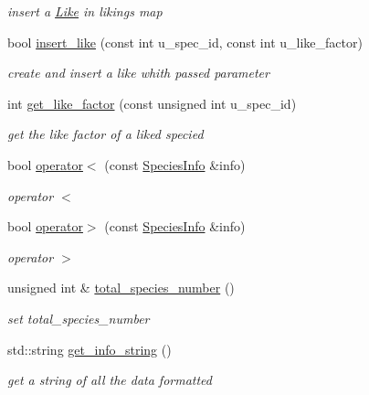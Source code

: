 \begin{DoxyCompactItemize}
\begin{DoxyCompactList}\small\item\em insert a \hyperlink{structLike}{Like} in likings map \end{DoxyCompactList}\item 
bool \hyperlink{structSpeciesInfo_a5c1c1c98c4f8bf4ae0b85d3c3943fff5}{insert\_\-like} (const int u\_\-spec\_\-id, const int u\_\-like\_\-factor)
\begin{DoxyCompactList}\small\item\em create and insert a like whith passed parameter \end{DoxyCompactList}\item 
int \hyperlink{structSpeciesInfo_af2f410c53b8adb2b66bb029bc6a56da8}{get\_\-like\_\-factor} (const unsigned int u\_\-spec\_\-id)
\begin{DoxyCompactList}\small\item\em get the like factor of a liked specied \end{DoxyCompactList}\item 
\hypertarget{structSpeciesInfo_ab9716bf0081511ea866d49e173bd0554}{
bool \hyperlink{structSpeciesInfo_ab9716bf0081511ea866d49e173bd0554}{operator$<$} (const \hyperlink{structSpeciesInfo}{SpeciesInfo} \&info)}
\label{structSpeciesInfo_ab9716bf0081511ea866d49e173bd0554}

\begin{DoxyCompactList}\small\item\em operator $<$ \end{DoxyCompactList}\item 
\hypertarget{structSpeciesInfo_aaf85b85e45a8a96031fef2ac27cdc84c}{
bool \hyperlink{structSpeciesInfo_aaf85b85e45a8a96031fef2ac27cdc84c}{operator$>$} (const \hyperlink{structSpeciesInfo}{SpeciesInfo} \&info)}
\label{structSpeciesInfo_aaf85b85e45a8a96031fef2ac27cdc84c}

\begin{DoxyCompactList}\small\item\em operator $>$ \end{DoxyCompactList}\item 
\hypertarget{structSpeciesInfo_a466ef9513c5df92ca5ab6a93ad553264}{
unsigned int \& \hyperlink{structSpeciesInfo_a466ef9513c5df92ca5ab6a93ad553264}{total\_\-species\_\-number} ()}
\label{structSpeciesInfo_a466ef9513c5df92ca5ab6a93ad553264}

\begin{DoxyCompactList}\small\item\em set total\_\-species\_\-number \end{DoxyCompactList}\item 
std::string \hyperlink{structSpeciesInfo_a51f083342422dbe73b4dca87de6a662b}{get\_\-info\_\-string} ()
\begin{DoxyCompactList}\small\item\em get a string of all the data formatted \end{DoxyCompactList}\end{DoxyCompactItemize}
